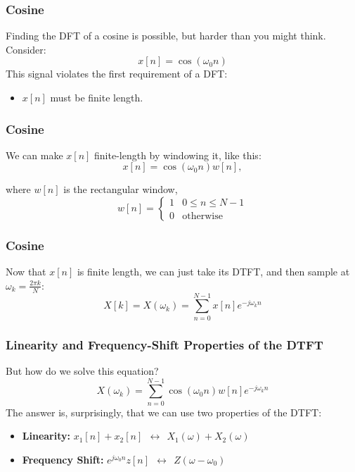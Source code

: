 \documentclass{beamer}
\begin{document}
\begin{frame}
  \frametitle{Cosine}

  Finding the DFT of a cosine is possible, but harder than you might think.
  Consider:
  \begin{displaymath}
    x[n] = \cos(\omega_0 n)
  \end{displaymath}
  This signal violates the first requirement of a DFT:
  \begin{itemize}
  \item $x[n]$ must be finite length.
  \end{itemize}
\end{frame}

\begin{frame}
  \frametitle{Cosine}

  We can make $x[n]$ finite-length by windowing it, like this:
  \begin{displaymath}
    x[n] = \cos(\omega_0 n)w[n],
  \end{displaymath}

  where $w[n]$ is the rectangular window,
  \begin{displaymath}
    w[n] =\begin{cases}
    1 & 0\le n \le N-1\\
    0 & \mbox{otherwise}
    \end{cases}
  \end{displaymath}
\end{frame}

\begin{frame}
  \frametitle{Cosine}

  Now that $x[n]$ is finite length, we can just take its DTFT, and
  then sample at $\omega_k=\frac{2\pi k}{N}$:
  \begin{displaymath}
    X[k] = X(\omega_k) = \sum_{n=0}^{N-1} x[n]e^{-j\omega_k n}
  \end{displaymath}

\end{frame}

\begin{frame}
  \frametitle{Linearity and Frequency-Shift Properties of the DTFT}

  But how do we solve this equation?
  \begin{displaymath}
    X(\omega_k) = \sum_{n=0}^{N-1} \cos(\omega_0 n)w[n] e^{-j\omega_k n}
  \end{displaymath}
  The answer is, surprisingly, that we can use two properties of the
  DTFT:
  \begin{itemize}
  \item {\bf Linearity:} $x_1[n]+x_2[n]~~\leftrightarrow~~X_1(\omega)+X_2(\omega)$
  \item {\bf Frequency Shift:} $e^{j\omega_0 n}z[n]~~\leftrightarrow~~Z(\omega-\omega_0)$
  \end{itemize}

\end{frame}
\end{document}
